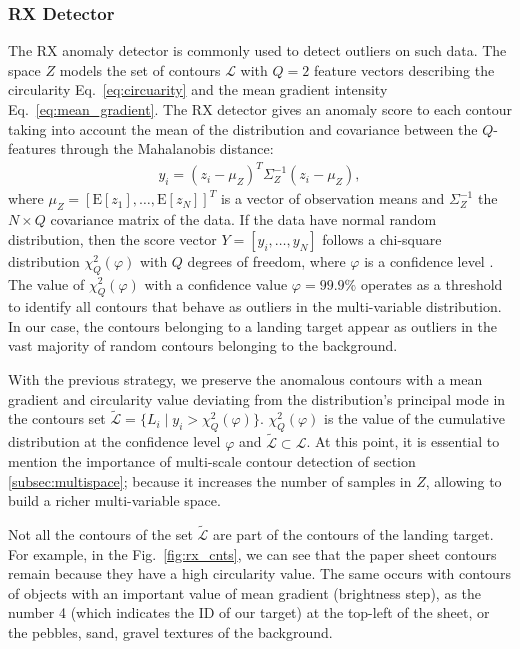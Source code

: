 \subsubsection{RX Detector}\label{subsec:rx_detector}
The RX anomaly detector \citep{Reed.Yu:TASSP:1990} is commonly used to detect outliers on such data. The space $Z$ models the set of contours $\mathcal{L}$ with $Q=2$ feature vectors describing the circularity Eq.\ \eqref{eq:circuarity} and the mean gradient intensity Eq.\ \eqref{eq:mean_gradient}. The RX detector gives an anomaly score to each contour taking into account the mean of the distribution and covariance between the $Q$-features through the Mahalanobis distance:
\begin{eqnarray}\label{eq:RX_detector}
y_{i}= (z_{i}-\mu_{Z})^{T}\Sigma^{-1}_{Z}(z_{i}-\mu_{Z}),
\end{eqnarray}
where $\mu_{Z}=[\mathrm{E}[z_{1}], \ldots, \mathrm{E}[z_{N}]]^T$ is a vector of observation means and $\Sigma^{-1}_{Z}$ the $N\times Q$ covariance matrix of the data. If the data have normal random distribution, then the score vector $Y=[y_{i}, \ldots, y_{N}]$ follows a chi-square distribution $\chi^{2}_{Q}(\varphi)$ with $Q$ degrees of freedom, where $\varphi$ is a confidence level \citep{Lu.Chen.ea:IJAIT:2004}. The value of $\chi^{2}_{Q}(\varphi)$ with a confidence value $\varphi=99.9\%$ operates as a threshold to identify all contours that behave as outliers in the multi-variable distribution. In our case, the contours belonging to a landing target appear as outliers in the vast majority of random contours belonging to the background.

With the previous strategy, we preserve the anomalous contours with a mean gradient and circularity value deviating from the distribution's principal mode in the contours set $\widetilde{\mathcal{L}}=\{L_{i}\mid y_{i}>\chi^{2}_{Q}(\varphi)\}$. $\chi^{2}_{Q}(\varphi)$ is the value of the cumulative distribution at the confidence level $\varphi$ and $\widetilde{\mathcal{L}} \subset \mathcal{L}$. At this point, it is essential to mention the importance of multi-scale contour detection of section \ref{subsec:multispace}; because it increases the number of samples in $Z$, allowing to build a richer multi-variable space.

Not all the contours of the set $\widetilde{\mathcal{L}}$ are part of the contours of the landing target. For example, in the Fig.\ \ref{fig:rx_cnts}, we can see that the paper sheet contours remain because they have a high circularity value. The same occurs with contours of objects with an important value of mean gradient (brightness step), as the number 4 (which indicates the ID of our target) at the top-left of the sheet, or the pebbles, sand, gravel textures of the background.

